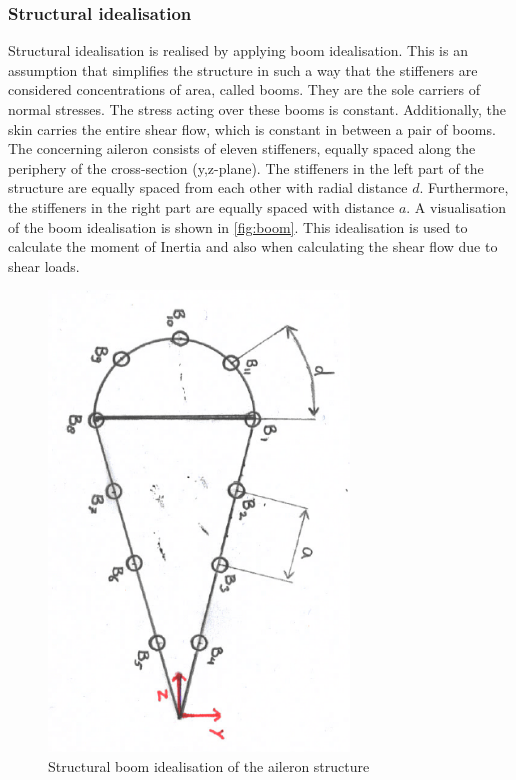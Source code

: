 \subsubsection{Structural idealisation}
\label{subsubsec:boom}
Structural idealisation is realised by applying boom idealisation. This is an assumption that simplifies the structure in such a way that the stiffeners are considered concentrations of area, called booms. They are the sole carriers of normal stresses. The stress acting over these booms is constant. Additionally, the skin carries the entire shear flow, which is constant in between a pair of booms.\\

\noindent The concerning aileron consists of eleven stiffeners, equally spaced along the periphery of the cross-section (y,z-plane). The stiffeners in the left part of the structure are equally spaced from each other with radial distance $d$. Furthermore, the stiffeners in the right part are equally spaced with distance $a$. A visualisation of the boom idealisation is shown in \autoref{fig:boom}.
This idealisation is used to calculate the moment of Inertia and also when calculating the shear flow due to shear loads.

\begin{figure}[H]
    \centering
    \includegraphics[width=8cm,angle=90]{Images/boom.pdf}
    \caption{Structural boom idealisation of the aileron structure}
    \label{fig:boom}
\end{figure}

